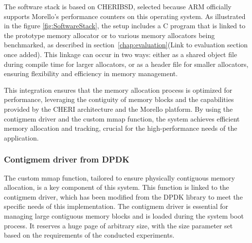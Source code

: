 The software stack is based on CHERIBSD\cite{noauthor_getting_nodate}, selected because ARM officially supports Morello's performance 
counters\cite{noauthor_arm_nodate} on this operating system. As illustrated in the figure \ref{fig:SoftwareStack}, the setup includes a C program that 
is linked to the prototype memory allocator or to various memory allocators being benchmarked, as described 
in section~\ref{chap:evaluation}(Link to evaluation section once added). This linkage can occur in two ways: either as a shared object file during compile time 
for larger allocators, or as a header file for smaller allocators, ensuring flexibility and efficiency 
in memory management.

This integration ensures that the memory allocation process is optimized for performance, leveraging the contiguity 
of memory blocks and the capabilities provided by the CHERI architecture and the Morello platform. By using the 
contigmem driver and the custom mmap function, the system achieves efficient memory allocation and tracking, 
crucial for the high-performance needs of the application.

\subsubsection{Contigmem driver from DPDK}
The custom mmap function, tailored to ensure physically contiguous memory allocation, is a key component 
of this system. This function is linked to the contigmem driver, which has been modified from the DPDK\cite{bi_dpdk-based_2016} library 
to meet the specific needs of this implementation. The contigmem driver is essential for managing large contiguous 
memory blocks and is loaded during the system boot process. It reserves a huge page of arbitrary size, with the 
size parameter set based on the requirements of the conducted experiments.

